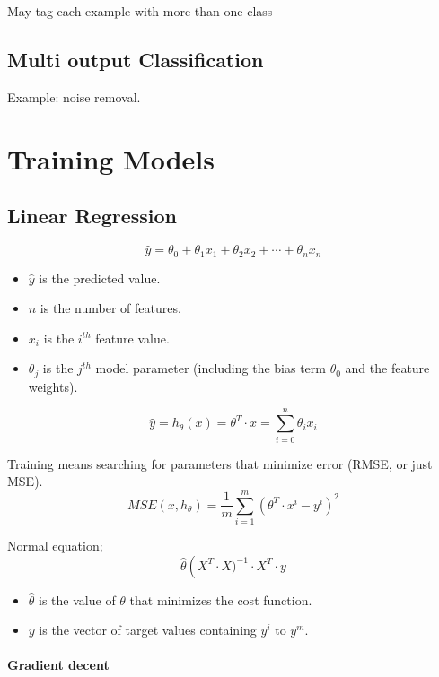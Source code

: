 \documentclass[10pt]{article}
\begin{document}
May tag each example with more than one class

\subsection{Multi output Classification}%
\label{sub:multioutput_classification}

Example: noise removal.

\section{Training Models}%
\label{sec:training_models}

\subsection{Linear Regression}%
\label{sub:linear_regression}

\[\hat{y}=\theta_0+\theta_1x_1+\theta_2x_2+\cdots+\theta_nx_n\]
\begin{itemize}
  \item \(\hat{y}\) is the predicted value.
  \item \(n\) is the number of features.
  \item \(x_i\) is the \(i^{th}\) feature value.
  \item \(\theta_j\) is the \(j^{th}\) model parameter (including the bias term
    \(\theta_0\) and the feature weights).
\end{itemize}

\[\hat{y}=h_\theta(x)=\theta^T\cdot x=\sum_{i=0}^{n}\theta_ix_i\]

Training means searching for parameters that minimize error (RMSE, or just
MSE).
\[MSE\left(x, h_\theta\right)=\frac{1}{m}\sum_{i=1}^{m}\left(\theta^T\cdot
x^i-y^i\right)^2\]

Normal equation;
\[\hat{\theta}\left(X^T\cdot X)^{-1}\cdot X^T\cdot y\]

  \begin{itemize}
    \item \(\hat{\theta}\) is the value of \(\theta\) that minimizes the cost
      function.
    \item \(y\) is the vector of target values containing \(y^i\) to \(y^m\).
  \end{itemize}

  \paragraph{Gradient decent}%
  \label{par:gradient_decent}
\end{document}
